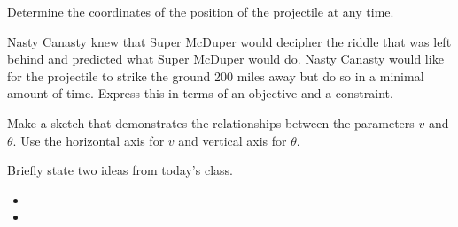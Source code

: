 \begin{problem}
\begin{subproblem}
    \vfill

  \item Determine the coordinates of the position of the projectile at
    any time.

    \vfill

  \item Nasty Canasty knew that Super McDuper would decipher the
    riddle that was left behind and predicted what Super McDuper would
    do. Nasty Canasty would like for the projectile to strike the
    ground 200 miles away but do so in a minimal amount of
    time. Express this in terms of an objective and a constraint.

    \vfill

    \clearpage

  \item Make a sketch that demonstrates the relationships between
      the parameters $v$ and $\theta$. Use the horizontal axis for $v$ and
      vertical axis for $\theta$.

      \vfill
    
  \end{subproblem}

\end{problem}

\postClass

\begin{problem}
\item Briefly state two ideas from today's class.
  \begin{itemize}
  \item 
  \item 
  \end{itemize}
\item 
  \begin{subproblem}
    \item
  \end{subproblem}
\end{problem}



